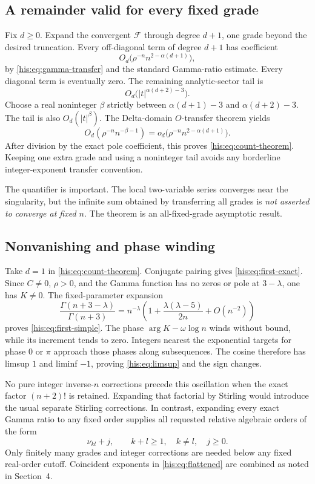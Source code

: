 \documentclass[11pt]{article}
\theoremstyle{remark}\newtheorem{remark}[theorem]{Remark}
\newcommand{\la}{\lambda}
\numberwithin{equation}{section}
\begin{document}
\subsection{A remainder valid for every fixed grade}
Fix $d\ge0$. Expand the convergent $\mathcal F$ through degree $d+1$, one grade beyond the desired truncation. Every off-diagonal term of degree $d+1$ has coefficient
\[
 O_d\bigl(\rho^{-n}n^{2-\alpha(d+1)}\bigr),
\]
by \eqref{his:eq:gamma-transfer} and the standard Gamma-ratio estimate. Every diagonal term is eventually zero. The remaining analytic-sector tail is
\[
 O_d\bigl(|t|^{\alpha(d+2)-3}\bigr).
\]
Choose a real noninteger $\beta$ strictly between $\alpha(d+1)-3$ and $\alpha(d+2)-3$. The tail is also $O_d(|t|^\beta)$. The Delta-domain $O$-transfer theorem \cite[Chapter~VI]{fs2009} yields
\[
 O_d(\rho^{-n}n^{-\beta-1})
 =o_d\bigl(\rho^{-n}n^{2-\alpha(d+1)}\bigr).
\]
After division by the exact pole coefficient, this proves \eqref{his:eq:count-theorem}. Keeping one extra grade and using a noninteger tail avoids any borderline integer-exponent transfer convention.

The quantifier is important. The local two-variable series converges near the singularity, but the infinite sum obtained by transferring all grades is \emph{not asserted to converge at fixed $n$}. The theorem is an all-fixed-grade asymptotic result.

\subsection{Nonvanishing and phase winding}
Take $d=1$ in \eqref{his:eq:count-theorem}. Conjugate pairing gives \eqref{his:eq:first-exact}. Since $C\ne0$, $\rho>0$, and the Gamma function has no zeros or pole at $3-\la$, one has $K\ne0$. The fixed-parameter expansion
\begin{equation}\label{his:eq:gamma-first}
 \frac{\Gamma(n+3-\la)}{\Gamma(n+3)}
 =n^{-\la}\left(1+\frac{\la(\la-5)}{2n}+O(n^{-2})\right)
\end{equation}
proves \eqref{his:eq:first-simple}. The phase $\arg K-\omega\log n$ winds without bound, while its increment tends to zero. Integers nearest the exponential targets for phase $0$ or $\pi$ approach those phases along subsequences. The cosine therefore has limsup $1$ and liminf $-1$, proving \eqref{his:eq:limsup} and the sign changes.

No pure integer inverse-$n$ corrections precede this oscillation when the exact factor $(n+2)!$ is retained. Expanding that factorial by Stirling would introduce the usual separate Stirling corrections. In contrast, expanding every exact Gamma ratio to any fixed order supplies all requested relative algebraic orders of the form
\begin{equation}\label{his:eq:flattened}
 \nu_{kl}+j,\qquad k+l\ge1,\quad k\ne l,\quad j\ge0.
\end{equation}
Only finitely many grades and integer corrections are needed below any fixed real-order cutoff. Coincident exponents in \eqref{his:eq:flattened} are combined as noted in Section~4.
\end{document}
